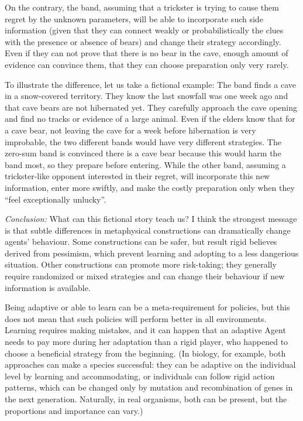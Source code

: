 \documentclass{article}
\begin{document}
On the contrary, the band, assuming that a trickster is trying to cause them regret by the unknown parameters, will be able to incorporate such side information (given that they can connect weakly or probabilistically the clues with the presence or absence of bears) and change their strategy accordingly.
Even if they can not prove that there is no bear in the cave, enough amount of evidence can convince them, that they can choose preparation only very rarely.

To illustrate the difference, let us take a fictional example:
The band finds a cave in a snow-covered territory. They know the last snowfall was one week ago and that cave bears are not hibernated yet. They carefully approach the cave opening and find no tracks or evidence of a large animal.
Even if the elders know that for a cave bear, not leaving the cave for a week before hibernation is very improbable, the two different bands would have very different strategies.
The zero-sum band is convinced there is a cave bear because this would harm the band most, so they prepare before entering.
While the other band, assuming a trickster-like opponent interested in their regret, will incorporate this new information, enter more swiftly, and make the costly preparation only when they ``feel exceptionally unlucky''.

{\it Conclusion:}
What can this fictional story teach us? I think the strongest message is that subtle differences in metaphysical constructions can dramatically change agents' behaviour.
Some constructions can be safer, but result rigid believes derived from pessimism, which prevent learning and adopting to a less dangerious situation.
Other constructions can promote more risk-taking; they generally require randomized or mixed strategies and can change their behaviour if new information is available.

Being adaptive or able to learn can be a meta-requirement for policies, but this does not mean that such policies will perform better in all environments.
Learning requires making mistakes, and it can happen that an adaptive Agent needs to pay more during her adaptation than a rigid player, who happened to choose a beneficial strategy from the beginning.
(In biology, for example, both approaches can make a species successful: they can be adaptive on the individual level by learning and accommodating, or individuals can follow rigid action patterns, which can be changed only by mutation and recombination of genes in the next generation. Naturally, in real organisms, both can be present, but the proportions and importance can vary.)
\end{document}
